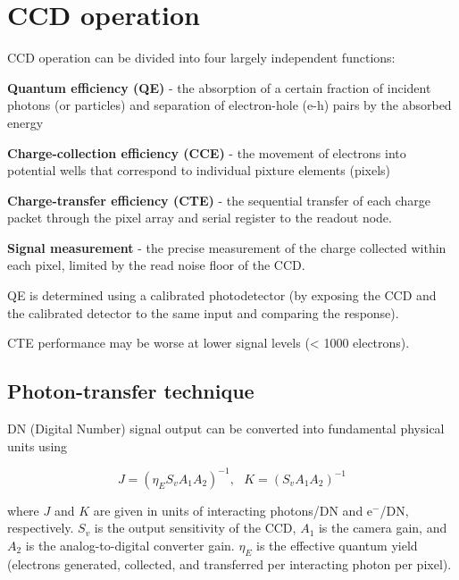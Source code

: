 \documentclass[10pt,fleqn]{article}
\begin{document}
\section{CCD operation \cite{janesick1987}}

CCD operation can be divided into four largely independent functions:
\begin{description}
\item{\textbf{Quantum efficiency (QE)}} - the absorption of a certain fraction of incident photons (or particles) and separation of electron-hole (e-h) pairs by the absorbed energy

\item{\textbf{Charge-collection efficiency (CCE)}} - the movement of electrons into potential wells that correspond to individual pixture elements (pixels)

\item{\textbf{Charge-transfer efficiency (CTE)}} - the sequential transfer of each charge packet through the pixel array and serial register to the readout node.

\item{\textbf{Signal measurement}} - the precise measurement of the charge collected within each pixel, limited by the read noise floor of the CCD.

\end{description}

QE is determined using a calibrated photodetector (by exposing the CCD and the calibrated detector to the same input and comparing the response).

CTE performance may be worse at lower signal levels (< 1000 electrons).

\subsection{Photon-transfer technique}
DN (Digital Number) signal output can be converted into fundamental physical units using

\[J = (\eta_E S_v A_1 A_2)^{-1}, \, \, \, \, K = (S_v A_1 A_2)^{-1}\]

where $J$ and $K$ are given in units of interacting photons/DN and e$^-$/DN, respectively. $S_v$ is the output sensitivity of the CCD, $A_1$ is the camera gain, and $A_2$ is the analog-to-digital converter gain. $\eta_E$ is the effective quantum yield (electrons generated, collected, and transferred per interacting photon per pixel).
\end{document}
